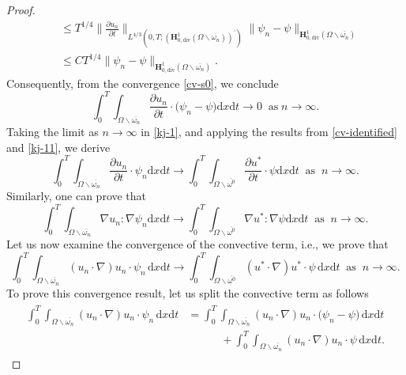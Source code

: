 \documentclass[a4paper,12pt,reqno,natbib]{amsart}
\newcommand{\dx} {\displaystyle\mathrm{d}x}
\newcommand{\dt} {\displaystyle\mathrm{d}t}
\def\H{\textbf{H}}
\begin{document}
\begin{proof}
\begin{align*}
    &\leq T^{1/4}\big\|\frac{\partial u_n}{\partial t} \big\|_{L^{4/3}(0,T;(\H^1_{0,\text{div}}(\Omega\backslash\overline{\omega_n}))^\prime)}\big\|\psi_n-\psi \big\|_{\H^1_{0,\text{div}}(\Omega\backslash\overline{\omega_n})}\\
    &\leq C T^{1/4}\big\|\psi_n-\psi \big\|_{\H^1_{0,\text{div}}(\Omega\backslash\overline{\omega_n})}.
\end{align*}
Consequently, from the convergence \eqref{cv-s0}, we conclude
\begin{equation}\label{kj-11}
    \int_0^T\int_{\Omega\backslash\overline{\omega_n}}\frac{\partial u_n}{\partial t}\cdot \big(\psi_n -\psi\big)\dx\dt\longrightarrow0\;\;\text{as}\;n\to\infty.
\end{equation}
Taking the limit as $n\to\infty$ in \eqref{kj-1}, and applying the results from \eqref{cv-identified} and \eqref{kj-11}, we derive
\begin{equation}\label{eq-21-cv21}
    \int_0^T\int_{\Omega\backslash\overline{\omega_n}}\frac{\partial u_n}{\partial t}\cdot \psi_n \dx\dt\longrightarrow\int_0^T\int_{\Omega\backslash\overline{\omega^0}}\frac{\partial u^*}{\partial t}\cdot \psi \dx\dt\;\;\text{as}\;\; n\longrightarrow\infty.
\end{equation}
Similarly, one can prove that 
\begin{equation}\label{cv-g-r}
    \int_0^T\int_{\Omega\backslash\overline{\omega_n}}\nabla u_n :\nabla \psi_n \dx\dt\longrightarrow \int_0^T\int_{\Omega\backslash\overline{\omega^0}}\nabla u^* :\nabla \psi \dx\dt\;\;\text{as}\;\; n\longrightarrow\infty.
\end{equation}
Let us now examine the convergence of the convective term, i.e., we prove that 
  \begin{equation}\label{convect-limit}
    \int_0^T\int_{\Omega\backslash\overline{\omega_n}} (u_n\cdot \nabla) u_n \cdot \psi_n\, \dx\dt\longrightarrow  \int_0^T\int_{\Omega\backslash\overline{\omega^0}} (u^*\cdot \nabla) u^* \cdot \psi\, \dx\dt\;\;\text{as}\;\; n\longrightarrow\infty.
\end{equation}
To prove this convergence result, let us split the convective term as follows
\begin{align}\label{covect-t-cv}
\begin{split}
\int_0^T\int_{\Omega\backslash\overline{\omega_n}} (u_n\cdot \nabla) u_n \cdot \psi_n\, \dx\dt&=  \int_0^T\int_{\Omega\backslash\overline{\omega_n}} (u_n\cdot \nabla) u_n \cdot \big(\psi_n-\psi\big)\, \dx\dt\\
&\qquad\quad+ \int_0^T\int_{\Omega\backslash\overline{\omega_n}} (u_n\cdot \nabla) u_n \cdot \psi\, \dx\dt.

\end{split}
\end{align}
\end{proof}
\end{document}
